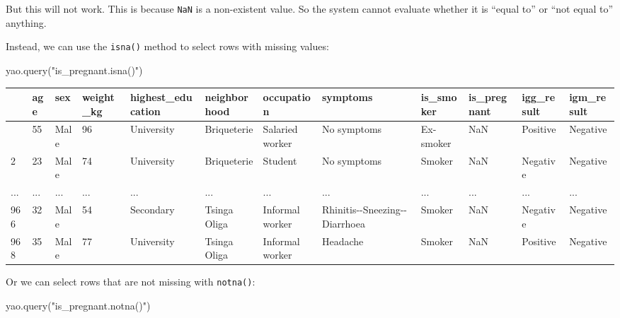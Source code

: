 \documentclass[
  letterpaper,
  DIV=11,
  numbers=noendperiod]{scrreprt}
\newenvironment{Shaded}{\begin{snugshade}}{\end{snugshade}}
\newcommand{\NormalTok}[1]{\textcolor[rgb]{0.00,0.23,0.31}{#1}}
\newcommand{\StringTok}[1]{\textcolor[rgb]{0.13,0.47,0.30}{#1}}
\begin{document}
But this will not work. This is because \texttt{NaN} is a non-existent
value. So the system cannot evaluate whether it is ``equal to'' or ``not
equal to'' anything.

Instead, we can use the \texttt{isna()} method to select rows with
missing values:

\begin{Shaded}
\begin{Highlighting}[]
\NormalTok{yao.query(}\StringTok{"is\_pregnant.isna()"}\NormalTok{)}
\end{Highlighting}
\end{Shaded}

\begin{longtable}[]{@{}llllllllllll@{}}
\toprule\noalign{}
& age & sex & weight\_kg & highest\_education & neighborhood &
occupation & symptoms & is\_smoker & is\_pregnant & igg\_result &
igm\_result \\
\midrule\noalign{}
\endhead
\bottomrule\noalign{}
\endlastfoot
1 & 55 & Male & 96 & University & Briqueterie & Salaried worker & No
symptoms & Ex-smoker & NaN & Positive & Negative \\
2 & 23 & Male & 74 & University & Briqueterie & Student & No symptoms &
Smoker & NaN & Negative & Negative \\
... & ... & ... & ... & ... & ... & ... & ... & ... & ... & ... & ... \\
966 & 32 & Male & 54 & Secondary & Tsinga Oliga & Informal worker &
Rhinitis-\/-Sneezing-\/-Diarrhoea & Smoker & NaN & Negative &
Negative \\
968 & 35 & Male & 77 & University & Tsinga Oliga & Informal worker &
Headache & Smoker & NaN & Positive & Negative \\
\end{longtable}

Or we can select rows that are not missing with \texttt{notna()}:

\begin{Shaded}
\begin{Highlighting}[]
\NormalTok{yao.query(}\StringTok{"is\_pregnant.notna()"}\NormalTok{)}
\end{Highlighting}
\end{Shaded}
\end{document}
